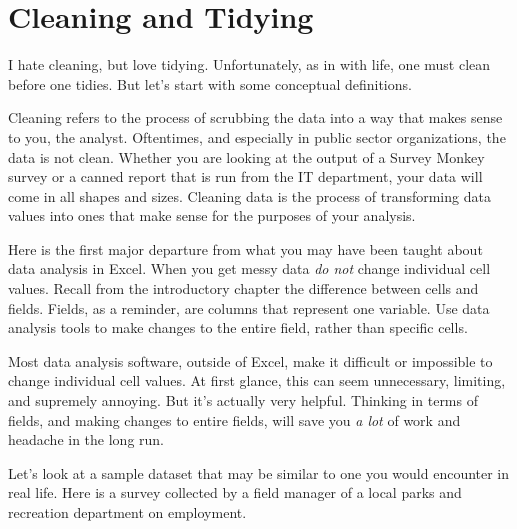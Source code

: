 \documentclass[]{book}
\begin{document}
\hypertarget{cleaning-and-tidying}{%
\section{Cleaning and Tidying}\label{cleaning-and-tidying}}

I hate cleaning, but love tidying. Unfortunately, as in with life, one must clean before one tidies. But let's start with some conceptual definitions.

Cleaning refers to the process of scrubbing the data into a way that makes sense to you, the analyst. Oftentimes, and especially in public sector organizations, the data is not clean. Whether you are looking at the output of a Survey Monkey survey or a canned report that is run from the IT department, your data will come in all shapes and sizes. Cleaning data is the process of transforming data values into ones that make sense for the purposes of your analysis.

Here is the first major departure from what you may have been taught about data analysis in Excel. When you get messy data \emph{do not} change individual cell values. Recall from the introductory chapter the difference between cells and fields. Fields, as a reminder, are columns that represent one variable. Use data analysis tools to make changes to the entire field, rather than specific cells.

Most data analysis software, outside of Excel, make it difficult or impossible to change individual cell values. At first glance, this can seem unnecessary, limiting, and supremely annoying. But it's actually very helpful. Thinking in terms of fields, and making changes to entire fields, will save you \emph{a lot} of work and headache in the long run.

Let's look at a sample dataset that may be similar to one you would encounter in real life. Here is a survey collected by a field manager of a local parks and recreation department on employment.
\end{document}
